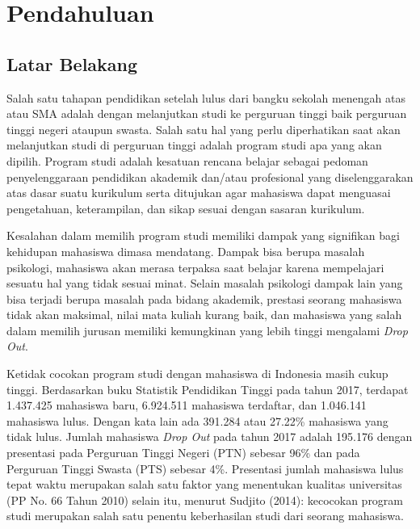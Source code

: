 \chapter{Pendahuluan}
\label{chap:pendahuluan}
   
\section{Latar Belakang}
\label{sec:laar belakang}
Salah satu tahapan pendidikan setelah lulus dari bangku sekolah menengah atas atau SMA adalah dengan melanjutkan studi ke perguruan tinggi baik perguruan tinggi negeri ataupun swasta. Salah satu hal yang perlu diperhatikan saat akan melanjutkan studi di perguruan tinggi adalah program studi apa yang akan dipilih. Program studi adalah kesatuan rencana belajar sebagai pedoman penyelenggaraan pendidikan akademik dan/atau profesional yang diselenggarakan atas dasar suatu kurikulum serta ditujukan agar mahasiswa dapat menguasai pengetahuan, keterampilan, dan sikap sesuai dengan sasaran kurikulum. %

Kesalahan dalam memilih program studi memiliki dampak yang signifikan bagi kehidupan mahasiswa dimasa mendatang. Dampak bisa berupa masalah psikologi, mahasiswa akan merasa terpaksa saat belajar karena mempelajari sesuatu hal yang tidak sesuai minat. Selain masalah psikologi dampak lain yang bisa terjadi berupa masalah pada bidang akademik, prestasi seorang mahasiswa tidak akan maksimal, nilai mata kuliah kurang baik, dan mahasiswa yang salah dalam memilih jurusan memiliki kemungkinan yang lebih tinggi mengalami \textit{Drop Out}.

Ketidak cocokan program studi dengan mahasiswa di Indonesia masih cukup tinggi. Berdasarkan buku Statistik Pendidikan Tinggi pada tahun 2017, terdapat 1.437.425 mahasiswa baru, 6.924.511 mahasiswa terdaftar, dan 1.046.141 mahasiswa lulus. Dengan kata lain ada 391.284 atau 27.22\% mahasiswa yang tidak lulus. Jumlah mahasiswa \textit{Drop Out} pada tahun 2017 adalah 195.176 dengan presentasi pada Perguruan Tinggi Negeri (PTN) sebesar 96\% dan pada Perguruan Tinggi Swasta (PTS) sebesar 4\%. Presentasi jumlah mahasiswa lulus tepat waktu merupakan salah satu faktor yang menentukan kualitas universitas (PP No. 66 Tahun 2010) selain itu, menurut Sudjito (2014): kecocokan program studi merupakan salah satu penentu keberhasilan studi dari seorang mahasiswa. %

